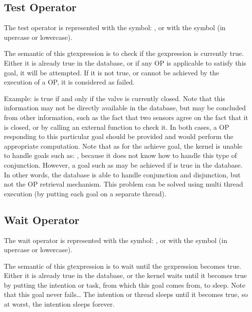 \subsection{Test Operator}

The test operator is represented with the symbol: , or with the
symbol  (in upercase or lowercase).

The semantic of this gtexpression is to check if the gexpression is
currently true. Either it is already true in the database, or if any OP is
applicable to satisfy this goal, it will be attempted. If it is not true,
or cannot be achieved by the execution of a OP, it is considered as
failed.

Example:  is true if and only if the valve is
currently closed. Note that this information may not be directly available in
the database, but may be concluded from other information, such as the fact
that two sensors agree on the fact that it is closed, or by calling an external
function to check it. In both cases, a OP responding to this particular goal
should be provided and would perform the appropriate computation. Note that as
for the achieve goal, the kernel is unable to handle goals such as: , because it does not know
how to handle this type of conjunction. However, a goal such as  may be achieved if  is true in the database. In other
words, the database is able to handle conjunction and disjunction, but not the
OP retrieval mechanism. This problem can be solved using multi thread
execution (by putting each goal on a separate thread).

\subsection{Wait Operator}

The wait operator is represented with the symbol: \samp{\^{}}, or with the
symbol  (in upercase or lowercase).

The semantic of this gtexpression is to wait until the gexpression becomes
true. Either it is already true in the database, or the kernel waits until it
becomes true by putting the intention or task, from which this goal comes from,
to sleep.  Note that this goal never fails\dots{} The intention or thread
sleeps until it becomes true, so at worst, the intention sleeps forever.

